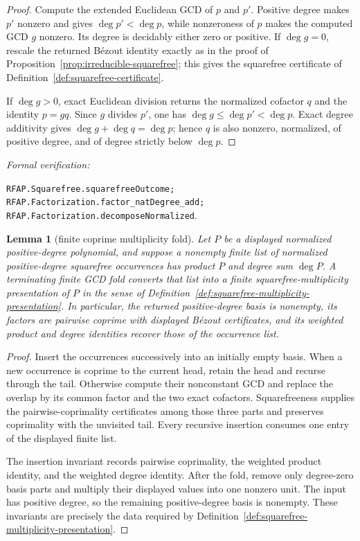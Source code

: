 \documentclass[11pt]{article}
\newtheorem{lemma}[theorem]{Lemma}
\newcommand{\Defref}[1]{Definition~\ref{#1}}
\newcommand{\leanref}[1]{\par\smallskip\noindent
  \emph{Formal verification:}\par\nobreak
  {\raggedright\nolinkurl{#1}.\par}}
\begin{document}
\begin{proof}
Compute the extended Euclidean GCD of $p$ and $p'$.  Positive degree makes
$p'$ nonzero and gives $\deg p'<\deg p$, while nonzeroness of $p$ makes the
computed GCD $g$ nonzero.  Its degree is decidably either zero or positive.
If $\deg g=0$, rescale the returned B\'ezout identity exactly as in the proof
of Proposition~\ref{prop:irreducible-squarefree}; this gives the squarefree certificate
of \Defref{def:squarefree-certificate}.

If $\deg g>0$, exact Euclidean division returns the normalized cofactor $q$
and the identity $p=gq$.  Since $g$ divides $p'$, one has
$\deg g\le\deg p'<\deg p$.  Exact degree additivity gives
$\deg g+\deg q=\deg p$; hence $q$ is also nonzero, normalized, of positive
degree, and of degree strictly below $\deg p$.
\end{proof}

\leanref{RFAP.Squarefree.squarefreeOutcome;
RFAP.Factorization.factor_natDegree_add;
RFAP.Factorization.decomposeNormalized}

\begin{lemma}[finite coprime multiplicity fold]
\label{lem:coprime-multiplicity-fold}
Let $P$ be a displayed normalized positive-degree polynomial, and suppose a
nonempty finite list of normalized positive-degree squarefree occurrences
has product $P$ and degree sum $\deg P$.  A terminating finite GCD
fold converts that list into a finite squarefree-multiplicity presentation of
$P$ in the sense of \Defref{def:squarefree-multiplicity-presentation}.
In particular, the returned positive-degree basis is nonempty, its factors
are pairwise coprime with displayed B\'ezout certificates, and its weighted
product and degree identities recover those of the occurrence list.
\end{lemma}

\begin{proof}
Insert the occurrences successively into an initially empty basis.  When a
new occurrence is coprime to the current head, retain the head and recurse
through the tail.  Otherwise compute their nonconstant GCD and replace the
overlap by its common factor and the two exact cofactors.  Squarefreeness
supplies the pairwise-coprimality certificates among those three parts and
preserves coprimality with the unvisited tail.  Every recursive insertion
consumes one entry of the displayed finite list.

The insertion invariant records pairwise coprimality, the weighted product
identity, and the weighted degree identity.  After the fold, remove only
degree-zero basis parts and multiply their displayed values into one nonzero
unit.  The input has positive degree, so the remaining positive-degree basis
is nonempty.  These invariants are precisely the data required by
\Defref{def:squarefree-multiplicity-presentation}.
\end{proof}
\end{document}
